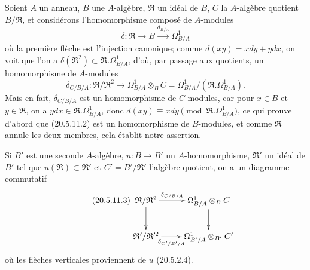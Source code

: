 \begin{env}[20.5.11]
\label{0.20.5.11-fr}
Soient $A$ un anneau, $B$ une $A$-algèbre, $\mathfrak{R}$ un idéal de $B$,
$C$ la $A$-algèbre quotient $B/\mathfrak{R}$, et considérons
l'homomorphisme composé de $A$-modules
\begin{equation}
\tag{20.5.11.1}
\label{0.20.5.11.1-fr}
  \delta:\mathfrak{R}\longrightarrow B\xrightarrow{d_{B/A}}\Omega^1_{B/A}
\end{equation}
où la première flèche est l'injection canonique; comme
$d(xy)=xdy+ydx$, on voit que l'on a
$\delta(\mathfrak{R}^2)\subset\mathfrak{R}.\Omega^1_{B/A}$, d'où, par
passage aux quotients, un homomorphisme de $A$-modules
\begin{equation}
\tag{20.5.11.2}
\label{0.20.5.11.2-fr}
  \delta_{C/B/A}:\mathfrak{R}/\mathfrak{R}^2\longrightarrow
  \Omega^1_{B/A}\otimes_B C=
  \Omega^1_{B/A}/(\mathfrak{R}.\Omega^1_{B/A}).
\end{equation}
Mais en fait, $\delta_{C/B/A}$ est un homomorphisme de $C$-modules, car
pour $x\in B$ et $y\in\mathfrak{R}$, on a
$ydx\in\mathfrak{R}.\Omega^1_{B/A}$, donc
$d(xy)\equiv xdy\pmod{\mathfrak{R}.\Omega^1_{B/A}}$, ce qui prouve
d'abord que (20.5.11.2) est un homomorphisme de $B$-modules, et comme
$\mathfrak{R}$ annule les deux membres, cela établit notre assertion.

Si $B'$ est une seconde $A$-algèbre, $u:B\to B'$ un $A$-homomorphisme,
$\mathfrak{R}'$ un idéal de $B'$ tel que
$u(\mathfrak{R})\subset\mathfrak{R}'$ et $C'=B'/\mathfrak{R}'$ l'algèbre
quotient, on a un diagramme commutatif
\begin{equation}
\tag{20.5.11.3}
\label{0.20.5.11.3-fr}
\xymatrix{
  \mathfrak{R}/\mathfrak{R}^2 \ar[r]^-{\delta_{C/B/A}} \ar[d] &
  \Omega^1_{B/A}\otimes_B C \ar[d] \\
  \mathfrak{R}'/\mathfrak{R}'^2 \ar[r]_-{\delta_{C'/B'/A}} &
  \Omega^1_{B'/A}\otimes_{B'} C'
}
\end{equation}
où les flèches verticales proviennent de $u$ (20.5.2.4).
\end{env}

